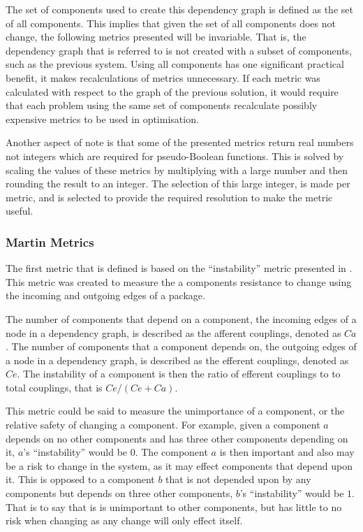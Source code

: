 The set of components used to create this dependency graph is defined as the set of all components.
This implies that given the set of all components does not change, the following metrics presented will be invariable.
That is, the dependency graph that is referred to is not created with a subset of components, such as the previous system.
Using all components has one significant practical benefit, it makes recalculations of metrics unnecessary.
If each metric was calculated with respect to the graph of the previous solution, 
it would require that each problem using the same set of components recalculate possibly expensive metrics to be used in optimisation.

Another aspect of note is that some of the presented metrics return real numbers not integers which are required for pseudo-Boolean functions.
This is solved by scaling the values of these metrics by multiplying with a large number and then rounding the result to an integer.
The selection of this large integer, is made per metric, and is selected to provide the required resolution to make the metric useful.

\subsubsection{Martin Metrics}
The first metric that is defined is based on the ``instability'' metric presented in \citep{martin2003}.
This metric was created to measure the a components resistance to change using the incoming and outgoing edges of a package.

\begin{defs}
The number of components that depend on a component, the incoming edges of a node in a dependency graph, is described as the afferent couplings, denoted as $Ca$.
The number of components that a component depends on, the outgoing edges of a node in a dependency graph, is described as the efferent couplings, denoted as $Ce$. 
The instability of a component is then the ratio of efferent couplings to to total couplings, that is $Ce/(Ce+Ca)$.
\end{defs}

This metric could be said to measure the unimportance of a component, or the relative safety of changing a component.
For example, given a component $a$ depends on no other components and has three other components depending on it, $a$'s ``instability'' would be $0$.
The component $a$ is then important and also may be a risk to change in the system, as it may effect components that depend upon it.
This is opposed to a component $b$ that is not depended upon by any components but depends on three other components, $b$'s ``instability'' would be $1$.
That is to say that is is unimportant to other components, but has little to no risk when changing as any change will only effect itself.

